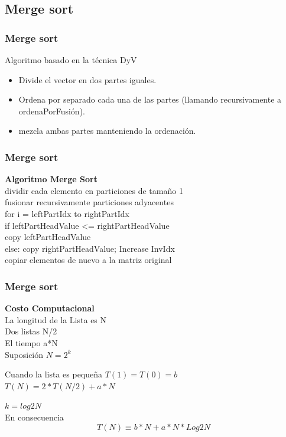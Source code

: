 \documentclass{beamer}
\begin{document}
\subsection{Merge sort}
\begin{frame}
 \frametitle{Merge sort}
    \begin{block}{}
Algoritmo basado en la técnica DyV
\begin{itemize}
    \item Divide el vector en dos partes iguales.
    \item Ordena por separado cada una de las partes (llamando recursivamente a ordenaPorFusión).
    \item mezcla ambas partes manteniendo la ordenación.
\end{itemize}
  \end{block}  
\end{frame}
\begin{frame}
 \frametitle{Merge sort}
    \begin{block}{}
\textbf{Algoritmo Merge Sort}\\
\newcommand\tab[1][1cm]{\hspace*{1}}
\textcolor{Micolor1}{
\tab dividir cada elemento en particiones de tamaño 1\\
\tab fusionar recursivamente particiones adyacentes\\}
\tab for i = leftPartIdx to rightPartIdx\\
\tab \tab   if leftPartHeadValue <= rightPartHeadValue\\
\tab \tab \tab      copy leftPartHeadValue\\
\tab \tab    else: copy rightPartHeadValue; Increase InvIdx\\
\textcolor{Micolor1}{
\tab copiar elementos de nuevo a la matriz original}
  \end{block}  
\end{frame}
  
  \begin{frame}
 \frametitle{Merge sort}
    \begin{block}{}
\textbf{Costo Computacional}\\
La longitud de la Lista es N\\
Dos listas N/2\\
El tiempo a*N\\
Suposición $N = 2^k$

Cuando la lista es pequeña  $T(1) = T(0)= b$\\
$T(N) = 2* T(N/2) + a* N$

$k = log2 N$\\
En consecuencia
\begin{equation}
T(N)\equiv b*N+a*N*Log2 N
\end{equation}
\end{block} 
\end{frame}
\end{document}
